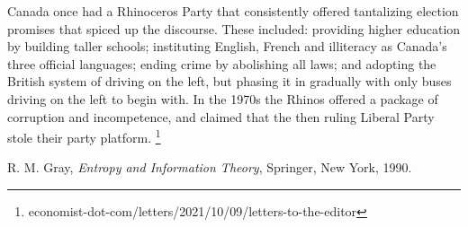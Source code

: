 \documentclass[11pt]{article}
\begin{document}
Canada once had a Rhinoceros Party that consistently offered tantalizing election promises that spiced up the discourse. These included: providing higher education by building taller schools; instituting English, French and illiteracy as Canada's three official languages; ending crime by abolishing all laws; and adopting the British system of driving on the left, but phasing it in gradually with only buses driving on the left to begin with. In the 1970s the Rhinos offered a package of corruption and incompetence, and claimed that the then ruling Liberal Party stole their party platform.%
\footnote{economist-dot-com/letters/2021/10/09/letters-to-the-editor}

%
%
%
%
\begin{thebibliography}{9}

R. M. Gray,
\textit{Entropy and Information Theory},
Springer, New York, 1990.

\end{thebibliography}
\end{document}

